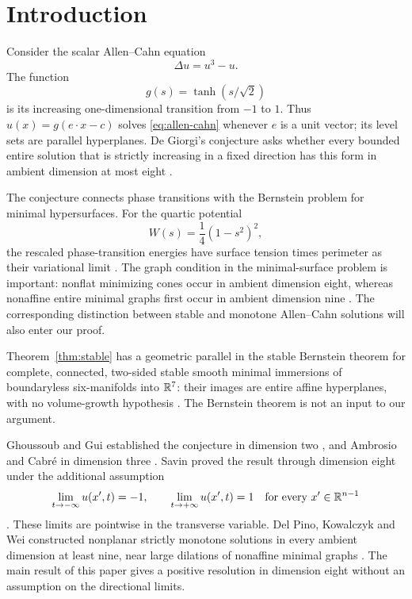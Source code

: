 \section{Introduction}\label{sec:introduction}

Consider the scalar Allen--Cahn equation
\begin{equation}\label{eq:allen-cahn}
 \Delta u=u^3-u.
\end{equation}
The function
\[
 g(s)=\tanh(s/\sqrt2)
\]
is its increasing one-dimensional transition from $-1$ to $1$.
Thus $u(x)=g(e\cdot x-c)$ solves \eqref{eq:allen-cahn} whenever
$e$ is a unit vector; its level sets are parallel hyperplanes.
De Giorgi's conjecture asks whether every bounded entire solution
that is strictly increasing in a fixed direction has this form in
ambient dimension at most eight \cite{DeGiorgi1979}.

The conjecture connects phase transitions with the Bernstein problem
for minimal hypersurfaces.  For the quartic potential
\[
 W(s)=\frac14(1-s^2)^2,
\]
the rescaled phase-transition energies have surface tension times
perimeter as their variational limit
\cite{ModicaMortola1977,Modica1987}.
The graph condition in the minimal-surface problem is important:
nonflat minimizing cones occur in ambient dimension eight, whereas
nonaffine entire minimal graphs first occur in ambient dimension nine
\cite{Simons1968,BDG1969}.
The corresponding distinction between stable and monotone
Allen--Cahn solutions will also enter our proof.

Theorem~\ref{thm:stable} has a geometric parallel in the stable Bernstein
theorem for complete, connected, two-sided stable smooth minimal immersions
of boundaryless six-manifolds into $\mathbb R^7$: their images are entire affine
hyperplanes, with no volume-growth hypothesis
\cite[Theorem~1.1]{HongLiWang2026}.
The Bernstein theorem is not an input to our argument.

Ghoussoub and Gui established the conjecture in dimension two
\cite{GhoussoubGui1998}, and Ambrosio and Cabr\'e in dimension three
\cite{AmbrosioCabre2000}.
Savin proved the result through dimension eight under the additional
assumption
\[
 \lim_{t\to-\infty}u(x',t)=-1,\qquad
 \lim_{t\to+\infty}u(x',t)=1
 \quad\text{for every }x'\in\mathbb R^{n-1}
\]
\cite[Theorem~2.4]{Savin2009}.
These limits are pointwise in the transverse variable.
Del Pino, Kowalczyk and Wei constructed nonplanar strictly monotone
solutions in every ambient dimension at least nine, near large
dilations of nonaffine minimal graphs \cite{DPKW2011}.
The main result of this paper gives a positive resolution in
dimension eight without an assumption on the directional
limits.


